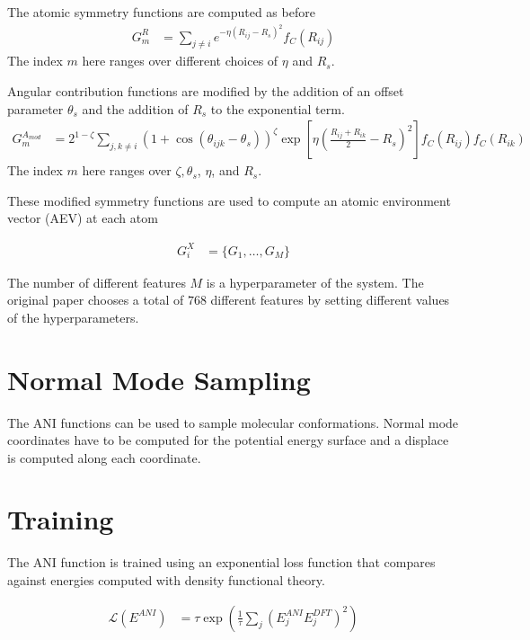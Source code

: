 \documentclass[book.tex]{subfiles}
\begin{document}
The atomic symmetry functions are computed as before
\begin{align}
G^R_m &= \sum_{j \neq i} e^{-\eta (R_{ij} - R_s)^2 } f_C(R_{ij})
\end{align}
The index $m$ here ranges over different choices of $\eta$ and $R_s$. 


Angular contribution functions are modified by the addition of an offset parameter $\theta_s$ and the addition of $R_s$ to the exponential term.
\begin{align}
G^{A_{mod}}_m &= 2^{1-\zeta} \sum_{j,k \neq i} (1 + \cos(\theta_{ijk} - \theta_s))^\zeta \exp \left [ \eta \left (\frac{R_{ij} + R_{ik}}{2} - R_s \right )^2 \right ] f_C(R_{ij}) f_C(R_{ik}) 
\end{align}
The index $m$ here ranges over $\zeta, \theta_s$, $\eta$, and $R_s$. 

These modified symmetry functions are used to compute an atomic environment vector (AEV) at each atom

\begin{align}
G^X_i &= \{G_1, \dotsc, G_M\}
\end{align}

The number of different features $M$ is a hyperparameter of the system. The original paper chooses a total of $768$ different features by setting different values of the hyperparameters.

\section{Normal Mode Sampling}

The ANI functions can be used to sample molecular conformations. Normal mode coordinates have to be computed for the potential energy surface and a displace is computed along each coordinate.

\section{Training}

The ANI function is trained using an exponential loss function that compares against energies computed with density functional theory.

\begin{align}
\mathcal{L}(E^{ANI}) &= \tau \exp \left ( \frac{1}{\tau} \sum_j (E^{ANI}_j E^{DFT}_j)^2 \right )
\end{align}
\end{document}
